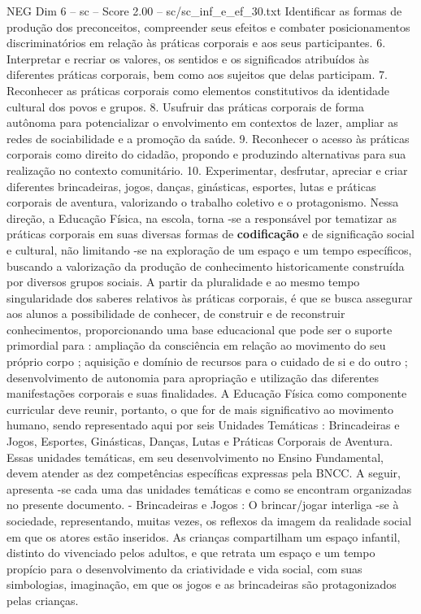 \begin{textsample}{NEG Dim 6 – sc – Score 2.00 – sc/sc\_inf\_e\_ef\_30.txt}
Identificar as formas de produção dos preconceitos, compreender seus efeitos e combater posicionamentos discriminatórios em relação às práticas corporais e aos seus participantes. 6.
Interpretar e recriar os valores, os sentidos e os significados atribuídos às diferentes práticas corporais, bem como aos sujeitos que delas participam. 7.
Reconhecer as práticas corporais como elementos constitutivos da identidade cultural dos povos e grupos. 8.
Usufruir das práticas corporais de forma autônoma para potencializar o envolvimento em contextos de lazer, ampliar as redes de sociabilidade e a promoção da saúde. 9.
Reconhecer o acesso às práticas corporais como direito do cidadão, propondo e produzindo alternativas para sua realização no contexto comunitário. 10.
Experimentar, desfrutar, apreciar e criar diferentes brincadeiras, jogos, danças, ginásticas, esportes, lutas e práticas corporais de aventura, valorizando o trabalho coletivo e o protagonismo.
Nessa direção, a Educação Física, na escola, torna -se a responsável por tematizar as práticas corporais em suas diversas formas de \textbf{codificação} e de significação social e cultural, não limitando -se na exploração de um espaço e um tempo específicos, buscando a valorização da produção de conhecimento historicamente construída por diversos grupos sociais.
A partir da pluralidade e ao mesmo tempo singularidade dos saberes relativos às práticas corporais, é que se busca assegurar aos alunos a possibilidade de conhecer, de construir e de reconstruir conhecimentos, proporcionando uma base educacional que pode ser o suporte primordial para : ampliação da consciência em relação ao movimento do seu próprio corpo ; aquisição e domínio de recursos para o cuidado de si e do outro ; desenvolvimento de autonomia para apropriação e utilização das diferentes manifestações corporais e suas finalidades.
A Educação Física como componente curricular deve reunir, portanto, o que for de mais significativo ao movimento humano, sendo representado aqui por seis Unidades Temáticas : Brincadeiras e Jogos, Esportes, Ginásticas, Danças, Lutas e Práticas Corporais de Aventura.
Essas unidades temáticas, em seu desenvolvimento no Ensino Fundamental, devem atender as dez competências específicas expressas pela BNCC.
A seguir, apresenta -se cada uma das unidades temáticas e como se encontram organizadas no presente documento. - Brincadeiras e Jogos : O brincar/jogar interliga -se à sociedade, representando, muitas vezes, os reflexos da imagem da realidade social em que os atores estão inseridos.
As crianças compartilham um espaço infantil, distinto do vivenciado pelos adultos, e que retrata um espaço e um tempo propício para o desenvolvimento da criatividade e vida social, com suas simbologias, imaginação, em que os jogos e as brincadeiras são protagonizados pelas crianças.

\end{textsample}
